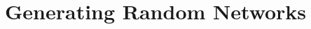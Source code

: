 \documentclass[draftcls,12pt,onecolumn]{IEEEtran}
\begin{document}







\maketitle





%
\IEEEpeerreviewmaketitle

\section{Generating Random Networks}
\end{document}
